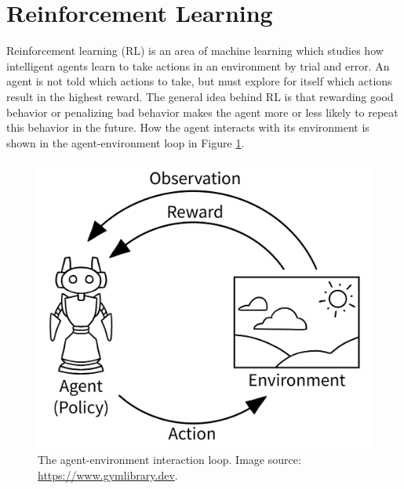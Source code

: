 \documentclass[a4paper]{article}
\begin{document}
\section{Reinforcement Learning} \label{s:reinforcement-learning}
Reinforcement learning (RL) is an area of machine learning which studies how intelligent agents learn to take actions in an environment by trial and error.
An agent is not told which actions to take, but must explore for itself which actions result in the highest reward.
The general idea behind RL is that rewarding good behavior or penalizing bad behavior makes the agent more or less likely to repeat this behavior in the future.
How the agent interacts with its environment is shown in the agent-environment loop in Figure \ref{fig:loop}.
\begin{figure}[htbp]
    \centering
    \includegraphics[width=.6\textwidth]{AE_loop}
    \caption{The agent-environment interaction loop. Image source: \url{https://www.gymlibrary.dev}.}
    \label{fig:loop}
\end{figure}
\end{document}
